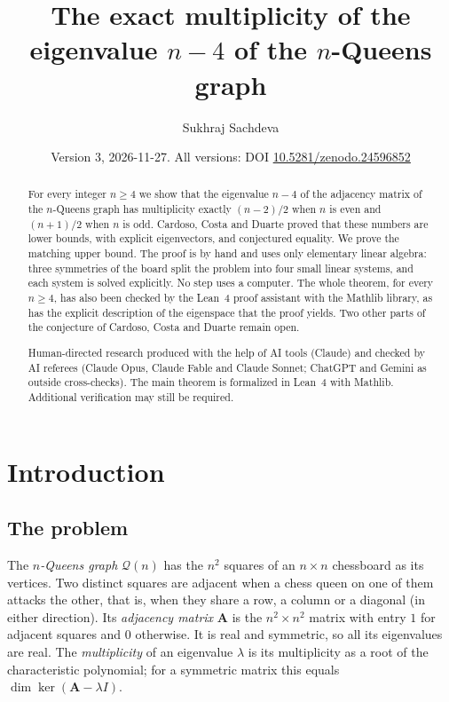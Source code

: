\documentclass[11pt]{amsart}
\title[The multiplicity of $n-4$ in the $n$-Queens graph]{The exact multiplicity of the eigenvalue $n-4$ of the $n$-Queens graph}
\author{Sukhraj Sachdeva}
\date{Version 3, 2026-11-27. All versions: DOI \href{https://doi.org/10.5281/zenodo.24596852}{10.5281/zenodo.24596852}}
\theoremstyle{plain}
\theoremstyle{definition}
\theoremstyle{remark}
\numberwithin{equation}{section}
\newcommand{\QG}{\mathcal{Q}}          %
\newcommand{\Adj}{\mathbf{A}}          %
\begin{document}
\begin{abstract}
For every integer \(n\ge 4\) we show that the eigenvalue \(n-4\) of the adjacency
matrix of the \(n\)-Queens graph has multiplicity exactly \((n-2)/2\) when \(n\) is even
and \((n+1)/2\) when \(n\) is odd. Cardoso, Costa and Duarte proved that these numbers
are lower bounds, with explicit eigenvectors, and conjectured equality. We prove the
matching upper bound. The proof is by hand and uses only elementary linear algebra:
three symmetries of the board split the problem into four small linear systems, and
each system is solved explicitly. No step uses a computer. The whole theorem, for every
\(n\ge4\), has also been checked by the Lean~4 proof assistant with the Mathlib library,
as has the explicit description of the eigenspace that the proof yields.
Two other parts of the conjecture of Cardoso, Costa and Duarte remain open.

Human-directed research produced with the help of AI tools (Claude) and checked by AI
referees (Claude Opus, Claude Fable and Claude Sonnet; ChatGPT and Gemini as outside
cross-checks). The main theorem is formalized in Lean~4 with Mathlib. Additional
verification may still be required.
\end{abstract}

\maketitle

\section{Introduction}\label{sec:intro}

\subsection{The problem}
The \emph{\(n\)-Queens graph} \(\QG(n)\) has the \(n^2\) squares of an \(n\times n\)
chessboard as its vertices. Two distinct squares are adjacent when a chess queen on one
of them attacks the other, that is, when they share a row, a column or a diagonal (in
either direction). Its \emph{adjacency matrix} \(\Adj\) is the \(n^2\times n^2\) matrix
with entry \(1\) for adjacent squares and \(0\) otherwise. It is real and symmetric, so
all its eigenvalues are real. The \emph{multiplicity} of an eigenvalue \(\lambda\) is its
multiplicity as a root of the characteristic polynomial; for a symmetric matrix this
equals \(\dim\ker(\Adj-\lambda I)\).
\end{document}
